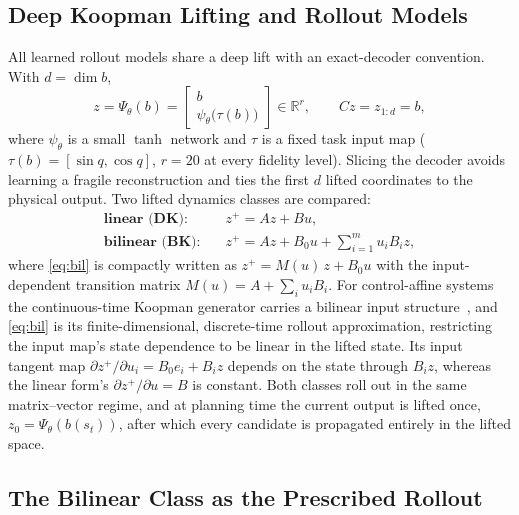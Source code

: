 \documentclass[letterpaper,10pt,conference]{ieeeconf}
\begin{document}
\subsection{Deep Koopman Lifting and Rollout Models}\label{subsec:models}

All learned rollout models share a deep lift with an exact-decoder convention.
With $d = \dim b$,
\begin{equation}
z = \Psi_\theta(b) =
\begin{bmatrix} b \\ \psi_\theta\big(\tau(b)\big) \end{bmatrix}
\in \mathbb{R}^{r},
\qquad
C z = z_{1:d} = b,
\label{eq:lift}
\end{equation}
where $\psi_\theta$ is a small $\tanh$ network and $\tau$ is a fixed task input map ($\tau(b) = [\sin q, \cos q]$, $r = 20$ at every fidelity level).
Slicing the decoder avoids learning a fragile reconstruction and ties the first $d$ lifted coordinates to the physical output.
Two lifted dynamics classes are compared:
\begin{align}
\textbf{linear (DK):}\quad
& z^{+} = A z + B u ,
\label{eq:lin}\\[2pt]
\textbf{bilinear (BK):}\quad
& z^{+} = A z + B_0 u + \sum_{i=1}^{m} u_i B_i z ,
\label{eq:bil}
\end{align}
where \eqref{eq:bil} is compactly written as $z^{+} = M(u)\, z + B_0 u$ with the input-dependent transition matrix $M(u) = A + \sum_i u_i B_i$.
For control-affine systems the continuous-time Koopman generator carries a bilinear input structure~\cite{iacob2024}, and \eqref{eq:bil} is its finite-dimensional, discrete-time rollout approximation, restricting the input map's state dependence to be linear in the lifted state. Its input tangent map $\partial z^{+} / \partial u_i = B_0 e_i + B_i z$ depends on the state through $B_i z$, whereas the linear form's $\partial z^{+}/\partial u = B$ is constant.
Both classes roll out in the same matrix--vector regime, and at planning time the current output is lifted once, $z_0 = \Psi_\theta(b(s_t))$, after which every candidate is propagated entirely in the lifted space.

\subsection{The Bilinear Class as the Prescribed Rollout}\label{subsec:representability}
\end{document}
